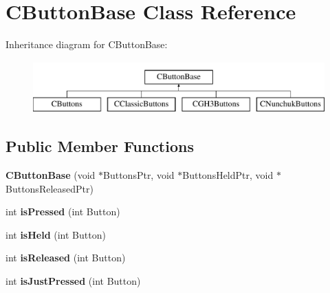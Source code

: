 \hypertarget{class_c_button_base}{\section{\-C\-Button\-Base \-Class \-Reference}
\label{class_c_button_base}
}
\-Inheritance diagram for \-C\-Button\-Base\-:\begin{figure}[H]
\begin{center}
\leavevmode
\includegraphics[height=2.000000cm]{class_c_button_base}
\end{center}
\end{figure}
\subsection*{\-Public \-Member \-Functions}
\begin{DoxyCompactItemize}
\item 
\hypertarget{class_c_button_base_a9c86334a1e2b3ba2c771b2e574c3dc67}{{\bfseries \-C\-Button\-Base} (void $\ast$\-Buttons\-Ptr, void $\ast$\-Buttons\-Held\-Ptr, void $\ast$\-Buttons\-Released\-Ptr)}\label{class_c_button_base_a9c86334a1e2b3ba2c771b2e574c3dc67}

\item 
\hypertarget{class_c_button_base_a0d4758b9e756a8c3c2bb39b907ea9170}{int {\bfseries is\-Pressed} (int \-Button)}\label{class_c_button_base_a0d4758b9e756a8c3c2bb39b907ea9170}

\item 
\hypertarget{class_c_button_base_a67e38daead9d22e33f6a3d85902d1f98}{int {\bfseries is\-Held} (int \-Button)}\label{class_c_button_base_a67e38daead9d22e33f6a3d85902d1f98}

\item 
\hypertarget{class_c_button_base_a575dee487bcca1abf29c1084dfdd5bb8}{int {\bfseries is\-Released} (int \-Button)}\label{class_c_button_base_a575dee487bcca1abf29c1084dfdd5bb8}

\item 
\hypertarget{class_c_button_base_ab74fd21217c5e379a613b7474af4f9b8}{int {\bfseries is\-Just\-Pressed} (int \-Button)}\label{class_c_button_base_ab74fd21217c5e379a613b7474af4f9b8}

\end{DoxyCompactItemize}
